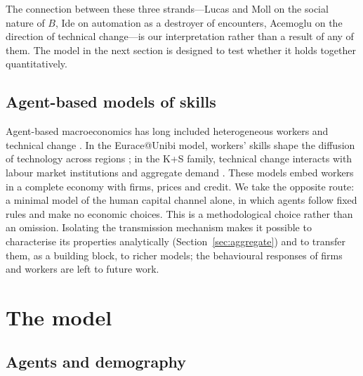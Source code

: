 \documentclass[preprint,12pt,authoryear]{elsarticle}
\begin{document}
The connection between these three strands---Lucas and Moll on the social nature of $B$, Ide on automation as a destroyer of encounters, Acemoglu on the direction of technical change---is our interpretation rather than a result of any of them. The model in the next section is designed to test whether it holds together quantitatively.

\subsection{Agent-based models of skills}

Agent-based macroeconomics has long included heterogeneous workers and technical change \citep{Tesfatsion2006,DawidDelliGatti2018}. In the Eurace@Unibi model, workers' skills shape the diffusion of technology across regions \citep{Dawid2012}; in the K+S family, technical change interacts with labour market institutions and aggregate demand \citep{Dosi2010,Dosi2017}. These models embed workers in a complete economy with firms, prices and credit. We take the opposite route: a minimal model of the human capital channel alone, in which agents follow fixed rules and make no economic choices. This is a methodological choice rather than an omission. Isolating the transmission mechanism makes it possible to characterise its properties analytically (Section~\ref{sec:aggregate}) and to transfer them, as a building block, to richer models; the behavioural responses of firms and workers are left to future work.

\section{The model}\label{sec:model}

\subsection{Agents and demography}
\end{document}
